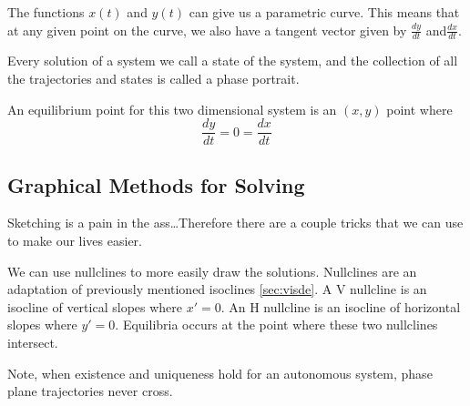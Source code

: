 \documentclass[12pt, landscape, twocolumn]{article}
\begin{document}
    The functions $x(t)$ and $y(t)$ can give us a parametric curve. This means that at any given point on the curve, we also have a tangent vector given by $\frac{dy}{dt}$ and$\frac{dx}{dt}$.

    Every solution of a system we call a state of the system, and the collection of all the trajectories and states is called a phase portrait.

    An equilibrium point for this two dimensional system is an $(x,y)$ point where
    \[
    \frac{dy}{dt} = 0 = \frac{dx}{dt}
    \]

    \subsection{Graphical Methods for Solving}
    Sketching is a pain in the ass\dots Therefore there are a couple tricks that we can use to make our lives easier.

    We can use nullclines to more easily draw the solutions. Nullclines are an adaptation of previously mentioned isoclines \eqref{sec:visde}. A V nullcline is an isocline of vertical slopes where $x\prime = 0$. An H nullcline is an isocline of horizontal slopes where $y\prime = 0$. Equilibria occurs at the point where these two nullclines intersect.

    Note, when existence and uniqueness hold for an autonomous system, phase plane trajectories never cross.
\end{document}
